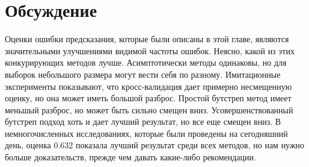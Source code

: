 \section{Обсуждение}
Оценки ошибки предсказания, которые были описаны в этой главе, являются значительными улучшениями видимой частоты ошибок. Неясно, какой из этих конкурирующих методов лучше. Асимптотически методы одинаковы, но для выборок небольшого размера могут вести себя по разному. Имитационные эксперименты показывают, что кросс-валидация дает примерно несмещенную оценку, но она может иметь большой разброс. Простой бутстреп метод имеет меньшый разброс, но может быть сильно смещен вниз. Усовершенствованный бутстреп подход хоть и дает лучший результат, но все еще смещен вниз. В немногочисленных исследованиях, которые были проведены на сегодняшний день, оценка 0.632 показала лучший результат среди всех методов, но нам нужно больше доказательств, прежде чем давать какие-либо рекомендации.

